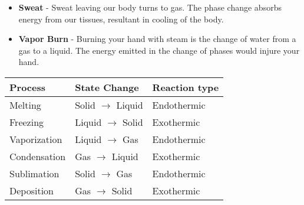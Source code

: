 \documentclass{article}
\begin{document}
\hspace{-30pt}\begin{minipage}{0.435\textwidth}

	\begin{itemize}
		\item \textbf{Sweat} - Sweat leaving our body turns to gas. The phase change absorbs energy from our tissues, resultant in cooling of the body.
		\item \textbf{Vapor Burn} - Burning your hand with steam is the change of water from a gas to a liquid. The energy emitted in the change of phases would injure your hand.
	\end{itemize}

\end{minipage}
\hspace{5pt}\begin{minipage}{0.7\textwidth}

	\renewcommand{\Tstrut}{\rule{0pt}{3ex}}         %
	\renewcommand{\Bstrut}{\rule[1ex]{0pt}{0pt}}   %
	\renewcommand{\TBstrut}{\Tstrut\Bstrut}
	\newcommand{\TTstrut}{\rule{0pt}{1ex}}         %
	\newcommand{\BBstrut}{\rule[1ex]{0pt}{0pt}}   %
	\newcommand{\TTBBstrut}{\Tstrut\Bstrut}
	\begin{tabular}{l@{\qquad\quad}l@{\qquad\quad}l}
		\hline
		\textbf{Process} & \textbf{State Change}                                                            & \textbf{Reaction type}                    \\
		\hline
		Melting          & \textcolor{red1!80!pag}{Solid} $\longrightarrow$ \textcolor{red3!80!pag}{Liquid} & \textcolor{pag!50}{Endothermic}\TBstrut   \\
		Freezing         & \textcolor{red3!80!pag}{Liquid} $\longrightarrow$ \textcolor{red1!80!pag}{Solid} & \textcolor{pag!50}{Exothermic} \TTBBstrut \\
		Vaporization     & \textcolor{red3!80!pag}{Liquid} $\longrightarrow$ \textcolor{red5!80!pag}{Gas}   & \textcolor{pag!50}{Endothermic}\TTBBstrut \\
		Condensation     & \textcolor{red5!80!pag}{Gas} $\longrightarrow$ \textcolor{red3!80!pag}{Liquid}   & \textcolor{pag!50}{Exothermic}\TTBBstrut  \\
		Sublimation      & \textcolor{red1!80!pag}{Solid} $\longrightarrow$ \textcolor{red5!80!pag}{Gas}    & \textcolor{pag!50}{Endothermic}\TTBBstrut \\
		Deposition       & \textcolor{red5!80!pag}{Gas} $\longrightarrow$ \textcolor{red1!80!pag}{Solid}    & \textcolor{pag!50}{Exothermic}\TTBBstrut  \\
		\hline
	\end{tabular}

\end{minipage}
\end{document}
